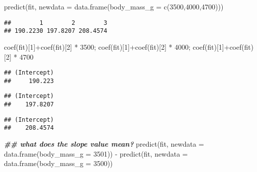 \documentclass[
]{article}
\newenvironment{Shaded}{\begin{snugshade}}{\end{snugshade}}
\newcommand{\AttributeTok}[1]{\textcolor[rgb]{0.77,0.63,0.00}{#1}}
\newcommand{\DecValTok}[1]{\textcolor[rgb]{0.00,0.00,0.81}{#1}}
\newcommand{\DocumentationTok}[1]{\textcolor[rgb]{0.56,0.35,0.01}{\textbf{\textit{#1}}}}
\newcommand{\FunctionTok}[1]{\textcolor[rgb]{0.00,0.00,0.00}{#1}}
\newcommand{\NormalTok}[1]{#1}
\newcommand{\SpecialCharTok}[1]{\textcolor[rgb]{0.00,0.00,0.00}{#1}}
\begin{document}
\begin{Shaded}
\begin{Highlighting}[]
\FunctionTok{predict}\NormalTok{(fit, }\AttributeTok{newdata =} \FunctionTok{data.frame}\NormalTok{(}\AttributeTok{body\_mass\_g =} \FunctionTok{c}\NormalTok{(}\DecValTok{3500}\NormalTok{,}\DecValTok{4000}\NormalTok{,}\DecValTok{4700}\NormalTok{)))}
\end{Highlighting}
\end{Shaded}

\begin{verbatim}
##        1        2        3 
## 190.2230 197.8207 208.4574
\end{verbatim}

\begin{Shaded}
\begin{Highlighting}[]
\FunctionTok{coef}\NormalTok{(fit)[}\DecValTok{1}\NormalTok{]}\SpecialCharTok{+}\FunctionTok{coef}\NormalTok{(fit)[}\DecValTok{2}\NormalTok{] }\SpecialCharTok{*} \DecValTok{3500}\NormalTok{; }\FunctionTok{coef}\NormalTok{(fit)[}\DecValTok{1}\NormalTok{]}\SpecialCharTok{+}\FunctionTok{coef}\NormalTok{(fit)[}\DecValTok{2}\NormalTok{] }\SpecialCharTok{*} \DecValTok{4000}\NormalTok{; }\FunctionTok{coef}\NormalTok{(fit)[}\DecValTok{1}\NormalTok{]}\SpecialCharTok{+}\FunctionTok{coef}\NormalTok{(fit)[}\DecValTok{2}\NormalTok{] }\SpecialCharTok{*} \DecValTok{4700}
\end{Highlighting}
\end{Shaded}

\begin{verbatim}
## (Intercept) 
##     190.223
\end{verbatim}

\begin{verbatim}
## (Intercept) 
##    197.8207
\end{verbatim}

\begin{verbatim}
## (Intercept) 
##    208.4574
\end{verbatim}

\begin{Shaded}
\begin{Highlighting}[]
\DocumentationTok{\#\# what does the slope value mean? }
\FunctionTok{predict}\NormalTok{(fit, }\AttributeTok{newdata =} \FunctionTok{data.frame}\NormalTok{(}\AttributeTok{body\_mass\_g =} \DecValTok{3501}\NormalTok{)) }\SpecialCharTok{{-}} \FunctionTok{predict}\NormalTok{(fit, }\AttributeTok{newdata =} \FunctionTok{data.frame}\NormalTok{(}\AttributeTok{body\_mass\_g =} \DecValTok{3500}\NormalTok{))}
\end{Highlighting}
\end{Shaded}
\end{document}
